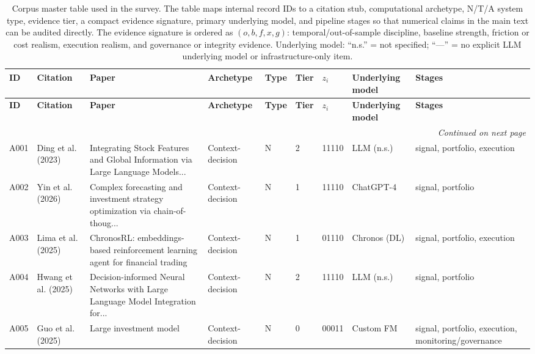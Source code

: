 \begingroup
\scriptsize
\setlength{\LTleft}{0pt}
\setlength{\LTright}{0pt}
\begin{longtable}{p{0.7cm} p{1.9cm} p{3.85cm} p{1.7cm} p{0.65cm} p{0.55cm} p{1.2cm} p{1.8cm} p{2.0cm}}
\caption{Corpus master table used in the survey. The table maps internal record IDs to a citation stub, computational archetype, N/T/A system type, evidence tier, a compact evidence signature, primary underlying model, and pipeline stages so that numerical claims in the main text can be audited directly. The evidence signature is ordered as $(o,b,f,x,g)$: temporal/out-of-sample discipline, baseline strength, friction or cost realism, execution realism, and governance or integrity evidence. Underlying model: ``n.s.'' = not specified; ``---'' = no explicit LLM underlying model or infrastructure-only item.}\label{tab:master-corpus}\\
\toprule
\textbf{ID} & \textbf{Citation} & \textbf{Paper} & \textbf{Archetype} & \textbf{Type} & \textbf{Tier} & \textbf{$z_i$} & \textbf{Underlying model} & \textbf{Stages} \\
\midrule
\endfirsthead
\toprule
\textbf{ID} & \textbf{Citation} & \textbf{Paper} & \textbf{Archetype} & \textbf{Type} & \textbf{Tier} & \textbf{$z_i$} & \textbf{Underlying model} & \textbf{Stages} \\
\midrule
\endhead
\midrule
\multicolumn{9}{r}{\emph{Continued on next page}}\\
\midrule
\endfoot
\bottomrule
\endlastfoot
A001 & Ding et al. (2023) & Integrating Stock Features and Global Information via Large Language Models... & Context-decision & N & 2 & 11110 & LLM (n.s.) & signal, portfolio, execution \\
A002 & Yin et al. (2026) & Complex forecasting and investment strategy optimization via chain-of-thoug... & Context-decision & N & 1 & 11110 & ChatGPT-4 & signal, portfolio \\
A003 & Lima et al. (2025) & ChronosRL: embeddings-based reinforcement learning agent for financial trading & Context-decision & N & 1 & 01110 & Chronos (DL) & signal, portfolio, execution \\
A004 & Hwang et al. (2025) & Decision-informed Neural Networks with Large Language Model Integration for... & Context-decision & N & 2 & 11110 & LLM (n.s.) & signal, portfolio \\
A005 & Guo et al. (2025) & Large investment model & Context-decision & N & 0 & 00011 & Custom FM & signal, portfolio, execution, monitoring/governance \\

\end{longtable}
